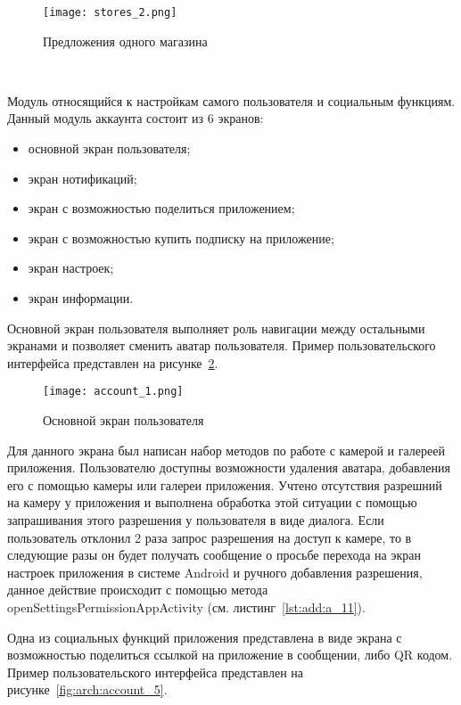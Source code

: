\begin{figure}[H]
 \centering
   \texttt{[image: stores\_2.png]} 
   \caption{Предложения одного магазина}
   \label{fig:arch:stores_2}
\end{figure}

~\par
Модуль относящийся к настройкам самого пользователя и социальным функциям. Данный модуль аккаунта состоит из 6 экранов:

\begin{itemize}
    \item основной экран пользователя;
    \item экран нотификаций;
    \item экран с возможностью поделиться приложением;
    \item экран с возможностью купить подписку на приложение;
    \item экран настроек;
    \item экран информации.
\end{itemize}

Основной экран пользователя выполняет роль навигации между остальными экранами и позволяет сменить аватар пользователя. Пример пользовательского интерфейса представлен на рисунке~\ref{fig:arch:account_1}.

\begin{figure}[H]
 \centering
   \texttt{[image: account\_1.png]} 
   \caption{Основной экран пользователя}
   \label{fig:arch:account_1}
\end{figure}


Для данного экрана был написан набор методов по работе с камерой и галереей приложения. Пользователю доступны возможности удаления аватара, добавления его с помощью камеры или галереи приложения. Учтено отсутствия разрешний на камеру у приложения и выполнена обработка этой ситуации с помощью запрашивания этого разрешения у пользователя в виде диалога. Если пользователь отклонил 2 раза запрос разрешения на доступ к камере, то в следующие разы он будет получать сообщение о просьбе перехода на экран настроек приложения в системе Android и ручного добавления разрешения, данное действие происходит с помощью метода openSettingsPermissionAppActivity (см. листинг~\ref{lst:add:a_11}).

Одна из социальных функций приложения представлена в виде экрана с возможностью поделиться ссылкой на приложение в сообщении, либо QR кодом. Пример пользовательского интерфейса представлен на рисунке~\ref{fig:arch:account_5}.

